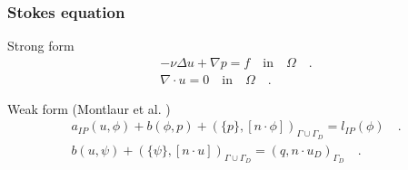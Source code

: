 \documentclass{beamer}
\begin{document}
\begin{frame}
\frametitle{Stokes equation}

\begin{block}{Strong form}
\begin{equation} \label{stokes_strong_form_ch3}
\begin{split}
-\nu \Delta u + \nabla p = f \quad \textrm{in} \quad \Omega \quad \textrm{.}\\
\nabla \cdot u = 0 \quad \textrm{in} \quad \Omega \quad \textrm{.}
\end{split}
\end{equation}
\end{block}

\begin{block}{Weak form (Montlaur et al. \cite{Montlaur2})}
\begin{equation}\label{stokes_weak_ch3}
\begin{split}
a_{IP}(u,\phi) + b(\phi,p) + (\{p\},[n\cdot \phi])_{\Gamma \cup \Gamma_D} = l_{IP}(\phi) \quad \textrm{.}\\
b(u,\psi) + (\{\psi\},[n\cdot u])_{\Gamma \cup \Gamma_D} = (q,n\cdot u_D)_{\Gamma_D} \quad \textrm{.}
\end{split}
\end{equation}
\end{block}

\end{frame}

\end{document}
